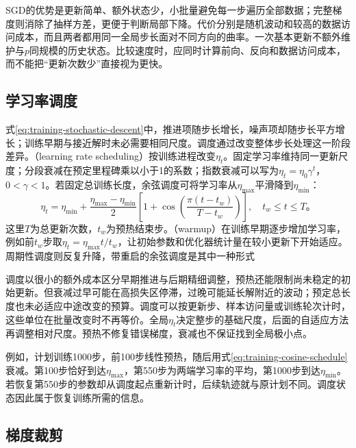 SGD的优势是更新简单、额外状态少，小批量避免每一步遍历全部数据；完整梯度则消除了抽样方差，更便于判断局部下降。代价分别是随机波动和较高的数据访问成本，而且两者都用同一全局步长面对不同方向的曲率。一次基本更新不额外维护与$p$同规模的历史状态。比较速度时，应同时计算前向、反向和数据访问成本，而不能把“更新次数少”直接视为更快。

\subsection{学习率调度}
\label{sec:training-schedules}

式\eqref{eq:training-stochastic-descent}中，推进项随步长增长，噪声项却随步长平方增长；训练早期与接近解时未必需要相同尺度。调度通过改变整体步长处理这一阶段差异。（learning rate scheduling）按训练进程改变$\eta_t$。固定学习率维持同一更新尺度；分段衰减在预定里程碑乘以小于1的系数；指数衰减可以写为$\eta_t=\eta_0\gamma^t$，$0<\gamma<1$。若固定总训练长度，余弦调度可将学习率从$\eta_{\max}$平滑降到$\eta_{\min}$：
\begin{equation}
  \eta_t=\eta_{\min}+\frac{\eta_{\max}-\eta_{\min}}2
  \left[1+\cos\left(\frac{\pi(t-t_w)}{T-t_w}\right)\right],
  \quad t_w\leq t\leq T\text{。}
  \label{eq:training-cosine-schedule}
\end{equation}
这里$T$为总更新次数，$t_w$为预热结束步。（warmup）在训练早期逐步增加学习率，例如前$t_w$步取$\eta_t=\eta_{\max}t/t_w$，让初始参数和优化器统计量在较小更新下开始适应。周期性调度则反复升降，带重启的余弦调度是其中一种形式

调度以很小的额外成本区分早期推进与后期精细调整，预热还能限制尚未稳定的初始更新。但衰减过早可能在高损失区停滞，过晚可能延长解附近的波动；预定总长度也未必适应中途改变的预算。调度可以按更新步、样本访问量或训练轮次计时，这些单位在批量改变时不再等价。全局$\eta_t$决定整步的基础尺度，后面的自适应方法再调整相对尺度。预热不修复错误梯度，衰减也不保证找到全局极小点。

例如，计划训练1000步，前100步线性预热，随后用式\eqref{eq:training-cosine-schedule}衰减。第100步恰好到达$\eta_{\max}$，第550步为两端学习率的平均，第1000步到达$\eta_{\min}$。若恢复第550步的参数却从调度起点重新计时，后续轨迹就与原计划不同。调度状态因此属于恢复训练所需的信息。

\subsection{梯度裁剪}
\label{sec:training-gradient-modification}

